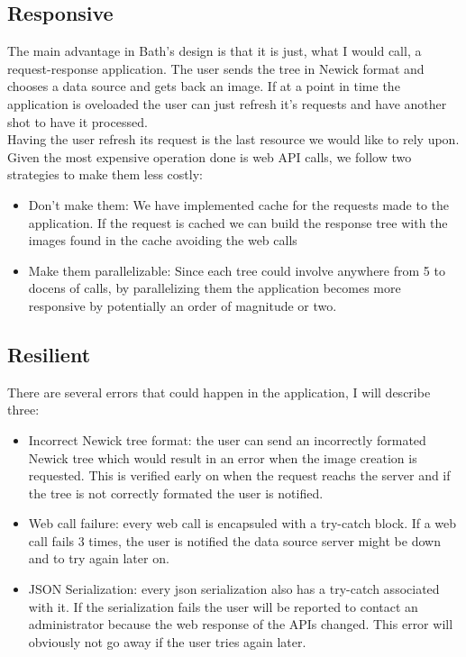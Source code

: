 \documentclass[10pt]{article}
\begin{document}
 \subsection{Responsive}
 	The main advantage in Bath's design is that it is just, what I would call, a request-response application. The user sends the tree in Newick format and chooses a data source and gets back an image. If at a point in time the application is oveloaded the user can just refresh it's requests and have another shot to have it processed.\\
 	
 	Having the user refresh its request is the last resource we would like to rely upon. Given the most expensive operation done is web API calls, we follow two strategies to make them less costly:\\
 	
 	\begin{itemize}
  		\item Don't make them: We have implemented cache for the requests made to the application. If the request is cached we can build the response tree with the images found in the cache avoiding the web calls
  		\item Make them parallelizable: Since each tree could involve anywhere from 5 to docens of calls, by parallelizing them the application becomes more responsive by potentially an order of magnitude or two.
	\end{itemize}
 	
 \subsection{Resilient}
 	There are several errors that could happen in the application, I will describe three:\\
 	
 	\begin{itemize}
  		\item Incorrect Newick tree format: the user can send an incorrectly formated Newick tree which would result in an error when the image creation is requested. This is verified early on when the request reachs the server and if the tree is not correctly formated the user is notified.
  		\item Web call failure: every web call is encapsuled with a try-catch block. If a web call fails 3 times, the user is notified the data source server might be down and to try again later on.
  		\item JSON Serialization: every json serialization also has a try-catch associated with it. If the serialization fails the user will be reported to contact an administrator because the web response of the APIs changed. This error will obviously not go away if the user tries again later.
	\end{itemize}
 	
\end{document}
